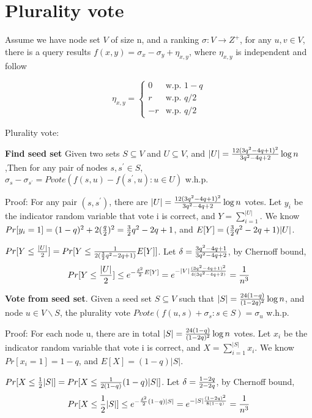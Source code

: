 \documentclass[]{article}
\title{}
\author{}
\begin{document}
\maketitle


\section{Plurality vote}

Assume we have node set $V$ of size n, and a ranking $\sigma:V\rightarrow Z^+$, for any $u,v\in V$, there is a query results $f(x,y)=\sigma_x-\sigma_y +\eta_{x,y}$, where $\eta_{x,y}$ is independent and follow 

\begin{displaymath}
\eta_{x,y} = \begin{cases}
0 & \text{w.p. } 1-q\\
r & \text{w.p. } q/2 \\
-r & \text{w.p. } q/2
\end{cases}
\end{displaymath}  

Plurality vote:

\textbf{Find seed set} Given two sets $S\subseteq V$ and $U\subseteq V$, and $|U|={12(3q^2-4q+1)^2\over 3q^2-4q+2}\log n$,Then for any pair of nodes $s,s^\prime\in S$, $\sigma_s-\sigma_{s^\prime}=Pvote(f(s,u)-f(s^\prime,u):u\in U)$ w.h.p.

Proof: For any pair $(s,s^\prime)$, there are $|U|={12(3q^2-4q+1)^2\over 3q^2-4q+2}\log n$ votes. Let $y_i$ be the indicator random variable that vote i is correct, and $Y=\sum_{i=1}^{|U|}$. We know $Pr[y_i=1]=(1-q)^2+2({q\over 2})^2={3\over 2}q^2-2q+1$, and $E[Y]=({3\over 2}q^2-2q+1)|U|$.

$Pr[Y\leq {|U|\over 2}]=Pr[Y\leq {1\over 2({3\over 2}q^2-2q+1)}E[Y]]$. Let $\delta ={3q^2-4q+1\over 3q^2-4q+2}$, by Chernoff bound, $$Pr[Y\leq {|U|\over 2}]\leq e^{-{\delta^2\over 2}E[Y]}=e^{-|V|{(3q^2-4q+1)^2\over 4(3q^2-4q+2)}}={1\over n^3}$$

\textbf{Vote from seed set}. Given a seed set $S\subseteq V$ such that $|S|={24(1-q)\over (1-2q)^2}\log n$, and node $u\in V\backslash S$, the plurality vote $Pvote(f(u,s)+\sigma_s:s\in S)=\sigma_u$ w.h.p.

Proof: For each node u, there are in total $|S|={24(1-q)\over (1-2q)^2}\log n$ votes. Let $x_i$ be the indicator random variable that vote i is correct, and $X=\sum_{i=1}^{|S|}x_i$. We know $Pr[x_i=1]=1-q$, and $E[X]=(1-q)|S|$.

$Pr[X\leq {1\over 2}|S|]=Pr[X\leq {1\over 2(1-q)}(1-q)|S|]$. Let $\delta ={1-2q\over 2-2q}$, by Chernoff bound,  $$Pr[X\leq {1\over 2}|S|]\leq e^{-{\delta^2\over 2}(1-q)|S|} =e^{-|S|{(1-2q)^2\over 8(1-q)}} ={1\over n^3}$$
\end{document}
